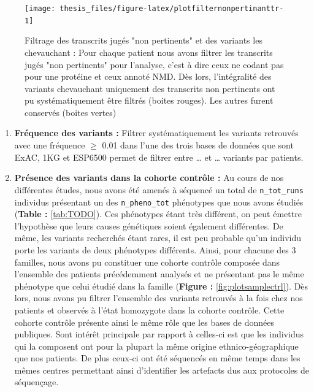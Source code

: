 \documentclass[12pt,twoside]{reedthesis}
\theoremstyle{definition}
\theoremstyle{definition}
\theoremstyle{remark}
\begin{document}
  \begin{figure}
  
  {\centering \texttt{[image: thesis\_files/figure-latex/plotfilternonpertinanttr-1]} 
  
  }
  
  \caption[Filtrage des transcrits jugés "non pertinents" et des variants les chevauchant]{Filtrage des transcrits jugés "non pertinents" et des variants les chevauchant : Pour chaque patient nous avons filtrer les transcrits jugés "non pertinents" pour l'analyse, c'est à dire ceux ne codant pas pour une protéine et ceux annoté NMD. Dès lors, l'intégralité des variants chevauchant uniquement des transcrits non pertinents ont pu systématiquement être filtrés (boites rouges). Les autres furent conservés (boites vertes)}\label{fig:plotfilternonpertinanttr}
  \end{figure}
  
  \begin{enumerate}
  \def\labelenumi{\arabic{enumi}.}
  \setcounter{enumi}{4}
  \item
    \textbf{Fréquence des variants :} Filtrer systématiquement les
    variants retrouvés avec une fréquence \(\ge\) 0.01 dans l'une des
    trois bases de données que sont ExAC, 1KG et ESP6500 permet de filtrer
    entre \ldots{} et \ldots{} variants par patients.
  \item
    \textbf{Présence des variants dans la cohorte contrôle :} Au cours de
    nos différentes études, nous avons été amenés à séquencé un total de
    \texttt{n\_tot\_runs} individus présentant un des
    \texttt{n\_pheno\_tot} phénotypes que nous avons étudiés
    (\textbf{Table : }\ref{tab:TODO}). Ces phénotypes étant très
    différent, on peut émettre l'hypothèse que leurs causes génétiques
    soient également différentes. De même, les variants recherchés étant
    rares, il est peu probable qu'un individu porte les variants de deux
    phénotypes différents. Ainsi, pour chacune des 3 familles, nous avons
    pu constituer une cohorte contrôle composée dans l'ensemble des
    patients précédemment analysés et ne présentant pas le même phénotype
    que celui étudié dans la famille (\textbf{Figure :}
    \ref{fig:plotsamplectrl}). Dès lors, nous avons pu filtrer l'ensemble
    des variants retrouvés à la fois chez nos patients et observés à
    l'état homozygote dans la cohorte contrôle. Cette cohorte contrôle
    présente ainsi le même rôle que les bases de données publiques. Sont
    intérêt principale par rapport à celles-ci est que les individus qui
    la composent ont pour la plupart la même origine ethnico-géographique
    que nos patients. De plus ceux-ci ont été séquencés en même temps dans
    les mêmes centres permettant ainsi d'identifier les artefacts dus aux
    protocoles de séquençage.
  \end{enumerate}
  
\end{document}
